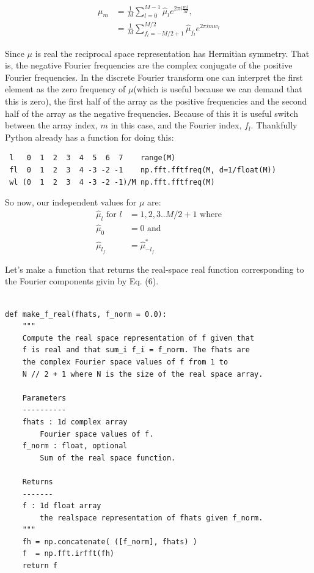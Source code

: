\documentclass[11pt]{article}
\begin{document}
\begin{align} 
   \mu_m &= \frac{1}{M} \sum_{l=0}^{M-1} \hat{\mu}_l e^{2\pi i \frac{m l}{M}}, \\
   &= \frac{1}{M} \sum_{f_l=-M/2 + 1}^{M/2} \hat{\mu}_{f_l} e^{2\pi i mw_l} 
\end{align}

Since $\mu$ is real the reciprocal space representation has Hermitian symmetry. That is, the negative Fourier frequencies are the complex conjugate of the positive Fourier frequencies. In the discrete Fourier transform one can interpret the first element as the zero frequency of $\mu$(which is useful because we can demand that this is zero), the first half of the array as the positive frequencies and the second half of the array as the negative frequencies. Because of this it is useful switch between the array index, $m$ in this case, and the Fourier index, $f_l$. Thankfully Python already has a function for doing this:

\begin{verbatim}
 l   0  1  2  3  4  5  6  7    range(M)
 fl  0  1  2  3  4 -3 -2 -1    np.fft.fftfreq(M, d=1/float(M))
 wl (0  1  2  3  4 -3 -2 -1)/M np.fft.fftfreq(M)
\end{verbatim}

So now, our independent values for $\mu$ are:
\begin{align}
   \hat{\mu}_l \text{  for } l &= 1, 2, 3 .. M/2 + 1 \text{  where}\\
   \hat{\mu}_0 &= 0 \text{  and} \\
   \hat{\mu}_{l_f} &= \hat{\mu}^*_{-l_f}
\end{align}

\newpage
Let's make a function that returns the real-space real function corresponding to the Fourier components givin by Eq. (6).
\begin{verbatim}

def make_f_real(fhats, f_norm = 0.0):
    """
    Compute the real space representation of f given that 
    f is real and that sum_i f_i = f_norm. The fhats are 
    the complex Fourier space values of f from 1 to 
    N // 2 + 1 where N is the size of the real space array.
    
    Parameters
    ----------
    fhats : 1d complex array
        Fourier space values of f.
    f_norm : float, optional
        Sum of the real space function.
              
    Returns
    -------
    f : 1d float array
        the realspace representation of fhats given f_norm.
    """
    fh = np.concatenate( ([f_norm], fhats) )
    f  = np.fft.irfft(fh)
    return f
    
\end{verbatim}
\end{document}
